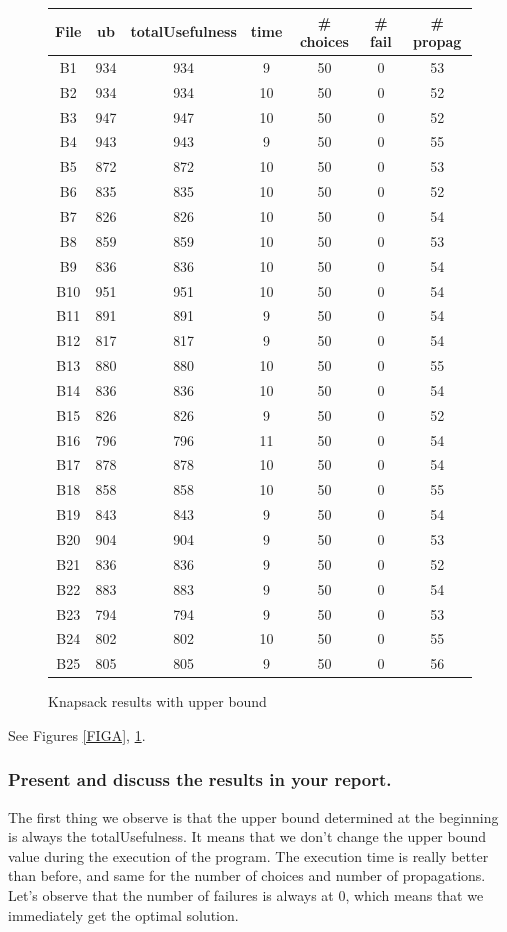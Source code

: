 \documentclass[a4paper ,12pt,french]{article}
\begin{document}
\begin{figure}[!ht]
\begin{tabular}{|c|c|c|c|c|c|c|}
\hline
File & ub & totalUsefulness & time & \# choices & \# fail & \# propag\\
\hline
\hline
B1&934&934&9&50&0&53
\\ \hline
B2&934&934&10&50&0&52
\\ \hline
B3&947&947&10&50&0&52
\\ \hline
B4&943&943&9&50&0&55
\\ \hline
B5&872&872&10&50&0&53
\\ \hline
B6&835&835&10&50&0&52
\\ \hline
B7&826&826&10&50&0&54
\\ \hline
B8&859&859&10&50&0&53
\\ \hline
B9&836&836&10&50&0&54
\\ \hline
B10&951&951&10&50&0&54
\\ \hline
B11&891&891&9&50&0&54
\\ \hline
B12&817&817&9&50&0&54
\\ \hline
B13&880&880&10&50&0&55
\\ \hline
B14&836&836&10&50&0&54
\\ \hline
B15&826&826&9&50&0&52
\\ \hline
B16&796&796&11&50&0&54
\\ \hline
B17&878&878&10&50&0&54
\\ \hline
B18&858&858&10&50&0&55
\\ \hline
B19&843&843&9&50&0&54
\\ \hline
B20&904&904&9&50&0&53
\\ \hline
B21&836&836&9&50&0&52
\\ \hline
B22&883&883&9&50&0&54
\\ \hline
B23&794&794&9&50&0&53
\\ \hline
B24&802&802&10&50&0&55
\\ \hline
B25&805&805&9&50&0&56
\\ \hline
\end{tabular}
\caption{Knapsack results with upper bound}
\label{FIGB}
\end{figure}

See Figures \ref{FIGA}, \ref{FIGB}.
\subsubsection{Present and discuss the results in your report.}

The first thing we observe is that the upper bound determined at the beginning is always the totalUsefulness. It means that we don't change the upper bound value during the execution of the program.
The execution time is really better than before, and same for the number of choices and number of propagations. Let's observe that the number of failures is always at 0, which means that we  immediately get the optimal solution.
\end{document}
